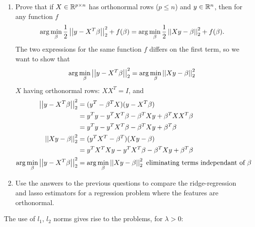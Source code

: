 \documentclass[12pt,twoside]{article}
\begin{document}
\begin{enumerate}
\begin{enumerate}
    \item Prove that if $X \in \mathbb{R}^{p \times n}$ has orthonormal rows ($p \leq n$) and $y \in \mathbb{R}^{n}$, then for any function $f$
\begin{align}
\arg \min_{\beta} \frac{1}{2} \left|\left|  y - X^T\beta  \right|\right| _{2}^2 + f(\beta) = \arg \min_{\beta} \frac{1}{2} \left|\left|  Xy - \beta  \right|\right| _{2}^2 + f(\beta).
\end{align}
The two expressions for the same function $f$ differs on the first term, so we want to show that
$$
\arg \min_{\beta} \left|\left|  y - X^T\beta  \right|\right| _{2}^2  =  \arg \min_{\beta} \left|\left|  Xy - \beta  \right|\right| _{2}^2
$$
$X$ having orthonormal rows: $X X^T = I$, and
\begin{align*}
	\left|\left|  y - X^T\beta  \right|\right| _{2}^2  	&= (y^T -\beta^T X) (y - X^T\beta) \\
						  	&= y^T y - y^T X^T \beta - \beta^T X y + \beta^T X X^T \beta \\
						  	&=   y^T y - y^T X^T \beta - \beta^T X y +  \beta^T \beta \\
	 \left|\left|  Xy - \beta  \right|\right| _{2}^2 		&= (y^T X^T - \beta^T) (Xy - \beta) \\
	 						&= y^T X^T X y - y^T X^T \beta - \beta^T X y +  \beta^T \beta \\
	\arg \min_{\beta} \left|\left|  y - X^T\beta  \right|\right| _{2}^2 &= \arg \min_{\beta}  \left|\left|  Xy - \beta  \right|\right| _{2}^2 \text{ eliminating terms independant of } \beta\\
\end{align*}

\item Use the answers to the previous questions to compare the ridge-regression and lasso estimators for a regression problem where the features are orthonormal.
  \end{enumerate}
The use of $l_1$, $l_2$ norms gives rise to the problems, for $\lambda > 0$:


\end{enumerate}
\end{document}
